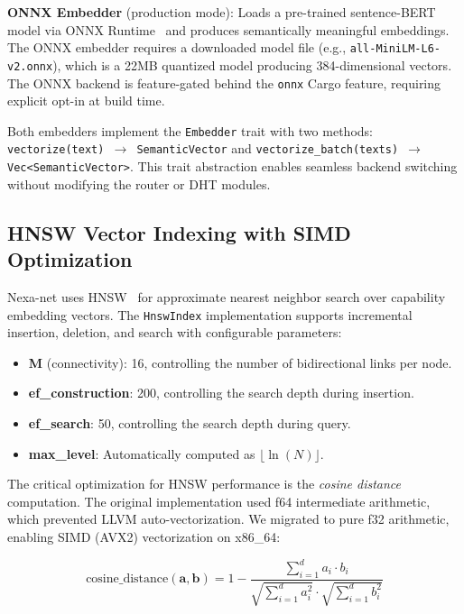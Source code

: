\textbf{ONNX Embedder} (production mode): Loads a pre-trained sentence-BERT~\cite{reimers2019sentence} model via ONNX Runtime~\cite{onnxruntime2021} and produces semantically meaningful embeddings. The ONNX embedder requires a downloaded model file (e.g., \texttt{all-MiniLM-L6-v2.onnx}), which is a 22MB quantized model producing 384-dimensional vectors. The ONNX backend is feature-gated behind the \texttt{onnx} Cargo feature, requiring explicit opt-in at build time.

Both embedders implement the \texttt{Embedder} trait with two methods: \texttt{vectorize(text) $\rightarrow$ SemanticVector} and \texttt{vectorize\_batch(texts) $\rightarrow$ Vec<SemanticVector>}. This trait abstraction enables seamless backend switching without modifying the router or DHT modules.

\subsection{HNSW Vector Indexing with SIMD Optimization}

Nexa-net uses HNSW~\cite{malkov2018hnsw} for approximate nearest neighbor search over capability embedding vectors. The \texttt{HnswIndex} implementation supports incremental insertion, deletion, and search with configurable parameters:

\begin{itemize}
  \item \textbf{M} (connectivity): 16, controlling the number of bidirectional links per node.
  \item \textbf{ef\_construction}: 200, controlling the search depth during insertion.
  \item \textbf{ef\_search}: 50, controlling the search depth during query.
  \item \textbf{max\_level}: Automatically computed as $\lfloor \ln(N) \rfloor$.
\end{itemize}

The critical optimization for HNSW performance is the \emph{cosine distance} computation. The original implementation used f64 intermediate arithmetic, which prevented LLVM auto-vectorization. We migrated to pure f32 arithmetic, enabling SIMD (AVX2) vectorization on x86\_64:

\begin{equation}
\text{cosine\_distance}(\mathbf{a}, \mathbf{b}) = 1 - \frac{\sum_{i=1}^{d} a_i \cdot b_i}{\sqrt{\sum_{i=1}^{d} a_i^2} \cdot \sqrt{\sum_{i=1}^{d} b_i^2}}
\end{equation}

